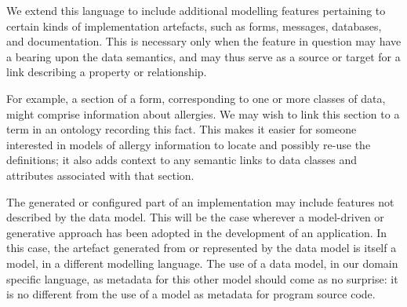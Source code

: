 We extend this language to include additional modelling features
pertaining to certain kinds of implementation artefacts, such as
forms, messages, databases, and documentation.  This is necessary only
when the feature in question may have a bearing upon the data
semantics, and may thus serve as a source or target for a link
describing a property or relationship.  

For example, a section of a form, corresponding to one or more classes
of data, might comprise information about allergies.  We may wish to
link this section to a term in an ontology recording this fact.  This
makes it easier for someone interested in models of allergy
information to locate and possibly re-use the definitions; it also
adds context to any semantic links to data classes and attributes
associated with that section.

The generated or configured part of an implementation may include
features not described by the data model.  This will be the case
wherever a model-driven or generative approach has been adopted in the
development of an application.  In this case, the artefact generated
from or represented by the data model is itself a model, in a
different modelling language.  The use of a data model, in our domain
specific language, as metadata for this other model should come as no
surprise: it is no different from the use of a model as metadata for
program source code. 
